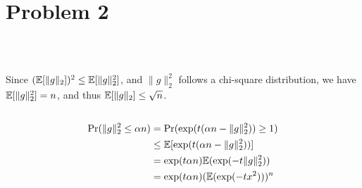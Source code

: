 \section{Problem 2}~\label{sec:prob2}

\subsection{} %

Since $({\mathbb{E}}[\|g\|_2])^2 \le {\mathbb{E}}[\|g\|_2^2]$,
and $\|g\|_2^2$ follows a chi-square distribution,
we have ${\mathbb{E}}[\|g\|_2^2]=n$,
and thus ${\mathbb{E}}[\|g\|_2]\le \sqrt{n}$.

\subsection{} %

\begin{equation}
\begin{split}
{\text{Pr}}(\|g\|_2^2\le\alpha n) & = {\text{Pr}}(\exp(t(\alpha n-\|g\|_2^2))\ge 1) \\
    & \le  {\mathbb{E}}[\exp(t(\alpha n-\|g\|_2^2))]  \\
    & = \exp(t\alpha n) {\mathbb{E}}(\exp(-t\|g\|_2^2))   \\
    & = \exp(t\alpha n) ({\mathbb{E}}(\exp(-tx^2)))^n \\
\end{split}
\end{equation}
